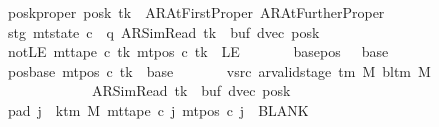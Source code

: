 \begin{isabellebody}
\ \ \ \ \ \ \ posk{\isacharunderscore}{\kern0pt}proper{\isacharcolon}{\kern0pt}\ {\isachardoublequoteopen}posk\ tk\ {\isasymin}\ {\isacharbraceleft}{\kern0pt}AR{\isacharunderscore}{\kern0pt}AtFirstProper{\isacharcomma}{\kern0pt}\ AR{\isacharunderscore}{\kern0pt}AtFurtherProper{\isacharbraceright}{\kern0pt}{\isachardoublequoteclose}\isanewline
\ \ \ \ \ \ \ stg{\isacharcolon}{\kern0pt}\ {\isachardoublequoteopen}mt{\isacharunderscore}{\kern0pt}state\ c{\isacharprime}{\kern0pt}\ {\isacharequal}{\kern0pt}\ {\isacharparenleft}{\kern0pt}q{\isacharcomma}{\kern0pt}\ AR{\isacharunderscore}{\kern0pt}SimRead{\isacharcomma}{\kern0pt}\ tk{\isacharcomma}{\kern0pt}\ {}{\isacharcomma}{\kern0pt}\ buf{\isacharcomma}{\kern0pt}\ dvec{\isacharcomma}{\kern0pt}\ posk{\isacharparenright}{\kern0pt}{\isachardoublequoteclose}\isanewline
\ \ \ \ \ \ \ notLE{\isacharcolon}{\kern0pt}\ {\isachardoublequoteopen}mt{\isacharunderscore}{\kern0pt}tape\ c{\isacharprime}{\kern0pt}\ tk\ {\isacharparenleft}{\kern0pt}mt{\isacharunderscore}{\kern0pt}pos\ c{\isacharprime}{\kern0pt}\ tk{\isacharparenright}{\kern0pt}\ {\isasymnoteq}\ LE{}{\isachardoublequoteclose}\isanewline
\ \ \ \ \ \ \ base{\isacharunderscore}{\kern0pt}pos{\isacharcolon}{\kern0pt}\ {\isachardoublequoteopen}{}\ {\isacharless}{\kern0pt}\ base{\isachardoublequoteclose}\isanewline
\ \ \ \ \ \ \ pos{\isacharunderscore}{\kern0pt}base{\isacharcolon}{\kern0pt}\ {\isachardoublequoteopen}mt{\isacharunderscore}{\kern0pt}pos\ c{\isacharprime}{\kern0pt}\ tk\ {\isacharequal}{\kern0pt}\ base{\isachardoublequoteclose}\isanewline
\ \ \ \ \ \ \ vsrc{\isacharcolon}{\kern0pt}\ {\isachardoublequoteopen}ar{\isacharunderscore}{\kern0pt}valid{\isacharunderscore}{\kern0pt}stage\ {\isacharparenleft}{\kern0pt}{\isasymGamma}{\isacharunderscore}{\kern0pt}tm\ M{\isacharparenright}{\kern0pt}\ {\isacharparenleft}{\kern0pt}bl{\isacharunderscore}{\kern0pt}tm\ M{\isacharparenright}{\kern0pt}\isanewline
\ \ \ \ \ \ \ \ \ \ \ \ \ \ \ \ \ \ \ {\isacharparenleft}{\kern0pt}AR{\isacharunderscore}{\kern0pt}SimRead{\isacharcomma}{\kern0pt}\ tk{\isacharcomma}{\kern0pt}\ {}{\isacharcomma}{\kern0pt}\ buf{\isacharcomma}{\kern0pt}\ dvec{\isacharcomma}{\kern0pt}\ posk{\isacharparenright}{\kern0pt}{\isachardoublequoteclose}\isanewline
\ \ \ \ \ \ \ pad{}{\isacharcolon}{\kern0pt}\ {\isachardoublequoteopen}{\isasymforall}j\ {\isasymge}\ k{\isacharunderscore}{\kern0pt}tm\ M{\isachardot}{\kern0pt}\ mt{\isacharunderscore}{\kern0pt}tape\ c{\isacharprime}{\kern0pt}\ j\ {\isacharparenleft}{\kern0pt}mt{\isacharunderscore}{\kern0pt}pos\ c{\isacharprime}{\kern0pt}\ j{\isacharparenright}{\kern0pt}\ {\isacharequal}{\kern0pt}\ BLANK{}{\isachardoublequoteclose}\isanewline

\end{isabellebody}
